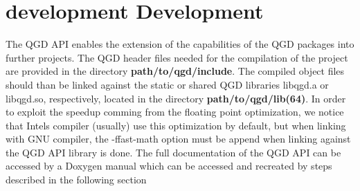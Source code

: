 \section*{development Development}

The Q\+GD A\+PI enables the extension of the capabilities of the Q\+GD packages into further projects. The Q\+GD header files needed for the compilation of the project are provided in the directory {\bfseries path/to/qgd/include}. The compiled object files should than be linked against the static or shared Q\+GD libraries libqgd.\+a or libqgd.\+so, respectively, located in the directory {\bfseries path/to/qgd/lib(64)}. In order to exploit the speedup comming from the floating point optimization, we notice that Intel\textquotesingle{}s compiler (usually) use this optimization by default, but when linking with G\+NU compiler, the -\/ffast-\/math option must be append when linking against the Q\+GD A\+PI library is done. The full documentation of the Q\+GD A\+PI can be accessed by a Doxygen manual which can be accessed and recreated by steps described in the following section 